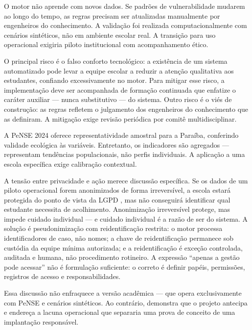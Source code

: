\documentclass[
    12pt,
    openright,
    oneside,
    a4paper,
    english,
    brazil
]{abntex2}
\begin{document}
O motor n\~ao aprende com novos dados. Se padr\~oes de vulnerabilidade mudarem ao longo do tempo, as regras precisam ser atualizadas manualmente por engenheiros do conhecimento. A valida\c{c}\~ao foi realizada computacionalmente com cen\'arios sint\'eticos, n\~ao em ambiente escolar real. A transi\c{c}\~ao para uso operacional exigiria piloto institucional com acompanhamento \'etico.

O principal risco \'e o falso conforto tecnol\'ogico: a exist\^encia de um sistema automatizado pode levar a equipe escolar a reduzir a aten\c{c}\~ao qualitativa aos estudantes, confiando excessivamente no motor. Para mitigar esse risco, a implementa\c{c}\~ao deve ser acompanhada de forma\c{c}\~ao continuada que enfatize o car\'ater auxiliar --- nunca substitutivo --- do sistema. Outro risco \'e o vi\'es de constru\c{c}\~ao: as regras refletem o julgamento dos engenheiros do conhecimento que as definiram. A mitiga\c{c}\~ao exige revis\~ao peri\'odica por comit\^e multidisciplinar.

A PeNSE 2024 oferece representatividade amostral para a Para\'iba, conferindo validade ecol\'ogica \`as vari\'aveis. Entretanto, os indicadores s\~ao agregados --- representam tend\^encias populacionais, n\~ao perfis individuais. A aplica\c{c}\~ao a uma escola espec\'ifica exige calibra\c{c}\~ao contextual.

A tens\~ao entre privacidade e a\c{c}\~ao merece discuss\~ao espec\'ifica. Se os dados de um piloto operacional forem anonimizados de forma irrevers\'ivel, a escola estar\'a protegida do ponto de vista da LGPD \cite{brasil_lgpd_2018}, mas n\~ao conseguir\'a identificar qual estudante necessita de acolhimento. Anonimiza\c{c}\~ao irrevers\'ivel protege, mas impede cuidado individual --- e cuidado individual \'e a raz\~ao de ser do sistema. A solu\c{c}\~ao \'e pseudonimiza\c{c}\~ao com reidentifica\c{c}\~ao restrita: o motor processa identificadores de caso, n\~ao nomes; a chave de reidentifica\c{c}\~ao permanece sob cust\'odia da equipe m\'inima autorizada; e a reidentifica\c{c}\~ao \'e exce\c{c}\~ao controlada, auditada e humana, n\~ao procedimento rotineiro. A express\~ao ``apenas a gest\~ao pode acessar'' n\~ao \'e formula\c{c}\~ao suficiente: o correto \'e definir pap\'eis, permiss\~oes, registros de acesso e responsabilidades.

Essa discuss\~ao n\~ao enfraquece a vers\~ao acad\^emica --- que opera exclusivamente com PeNSE e cen\'arios sint\'eticos. Ao contr\'ario, demonstra que o projeto antecipa e endere\c{c}a a lacuna operacional que separaria uma prova de conceito de uma implanta\c{c}\~ao respons\'avel.
\end{document}
